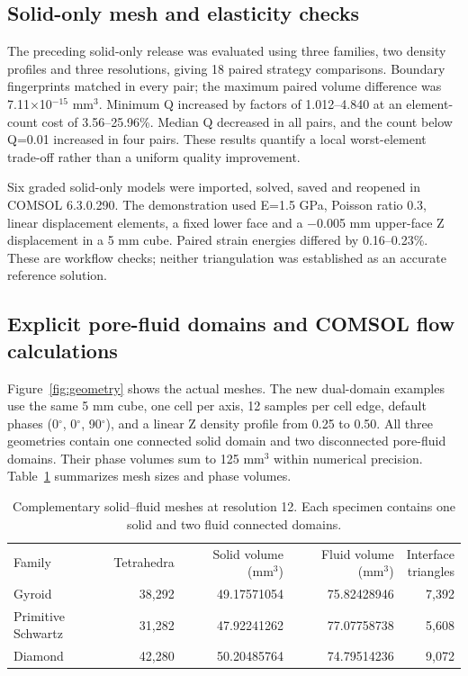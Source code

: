\documentclass[preprint,12pt,a4paper]{elsarticle}
\begin{document}
\subsection{Solid-only mesh and elasticity checks}

The preceding solid-only release was evaluated using three families, two density profiles and three resolutions, giving 18 paired strategy comparisons. Boundary fingerprints matched in every pair; the maximum paired volume difference was 7.11$\times$10$^{-15}$ mm$^3$. Minimum Q increased by factors of 1.012--4.840 at an element-count cost of 3.56--25.96\%. Median Q decreased in all pairs, and the count below Q=0.01 increased in four pairs. These results quantify a local worst-element trade-off rather than a uniform quality improvement.

Six graded solid-only models were imported, solved, saved and reopened in COMSOL 6.3.0.290. The demonstration used E=1.5 GPa, Poisson ratio 0.3, linear displacement elements, a fixed lower face and a $-$0.005 mm upper-face Z displacement in a 5 mm cube. Paired strain energies differed by 0.16--0.23\%. These are workflow checks; neither triangulation was established as an accurate reference solution.

\subsection{Explicit pore-fluid domains and COMSOL flow calculations}

Figure~\ref{fig:geometry} shows the actual meshes. The new dual-domain examples use the same 5 mm cube, one cell per axis, 12 samples per cell edge, default phases (0$^\circ$, 0$^\circ$, 90$^\circ$), and a linear Z density profile from 0.25 to 0.50. All three geometries contain one connected solid domain and two disconnected pore-fluid domains. Their phase volumes sum to 125 mm$^3$ within numerical precision. Table~\ref{tab:meshes} summarizes mesh sizes and phase volumes.

\begin{table}[!htbp]
\centering\footnotesize
\caption{Complementary solid--fluid meshes at resolution 12. Each specimen contains one solid and two fluid connected domains.}
\label{tab:meshes}
\begin{tabular}{@{}lrrrr@{}}
\toprule
Family & Tetrahedra & \shortstack{Solid volume\\(mm$^3$)} & \shortstack{Fluid volume\\(mm$^3$)} & \shortstack{Interface\\triangles} \\
Gyroid & 38,292 & 49.17571054 & 75.82428946 & 7,392 \\
Primitive Schwartz & 31,282 & 47.92241262 & 77.07758738 & 5,608 \\
Diamond & 42,280 & 50.20485764 & 74.79514236 & 9,072 \\
\bottomrule
\end{tabular}
\end{table}
\end{document}

